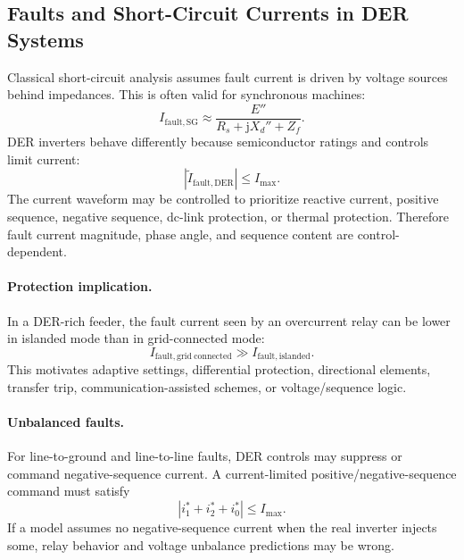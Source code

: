 \documentclass[11pt]{article}
\newcommand{\junit}{\mathrm{j}}
\begin{document}
\subsection{Faults and Short-Circuit Currents in DER Systems}
Classical short-circuit analysis assumes fault current is driven by voltage
sources behind impedances. This is often valid for synchronous machines:
\begin{equation}
I_{\mathrm{fault,SG}}\approx \frac{E''}{R_s+\junit X_d''+Z_f}.
\end{equation}
DER inverters behave differently because semiconductor ratings and controls
limit current:
\begin{equation}
|\tilde{I}_{\mathrm{fault,DER}}|\le I_{\max}.
\end{equation}
The current waveform may be controlled to prioritize reactive current, positive
sequence, negative sequence, dc-link protection, or thermal protection. Therefore
fault current magnitude, phase angle, and sequence content are control-dependent.

\paragraph{Protection implication.}
In a DER-rich feeder, the fault current seen by an overcurrent relay can be
lower in islanded mode than in grid-connected mode:
\begin{equation}
I_{\mathrm{fault,grid\ connected}}\gg I_{\mathrm{fault,islanded}}.
\end{equation}
This motivates adaptive settings, differential protection, directional
elements, transfer trip, communication-assisted schemes, or voltage/sequence
logic.

\paragraph{Unbalanced faults.}
For line-to-ground and line-to-line faults, DER controls may suppress or command
negative-sequence current. A current-limited positive/negative-sequence command
must satisfy
\begin{equation}
|i_1^*+i_2^*+i_0^*|\le I_{\max}.
\end{equation}
If a model assumes no negative-sequence current when the real inverter injects
some, relay behavior and voltage unbalance predictions may be wrong.
\end{document}
